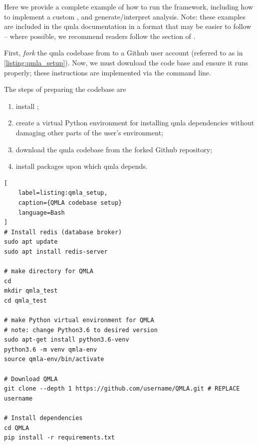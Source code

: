 Here we provide a complete example of how to run the  framework, 
    including how to implement a custom , 
    and generate/interpret analysis.
Note: these examples are included in the \gls{qmla} documentation in a format that may be easier to follow -- 
    where possible, we recommend readers follow the  section of \cite{qmla_docs}.

\par 

First, \emph{fork} the \gls{qmla} codebase from \cite{flynn2021QMLA}
    to a Github user account (referred to as  in \cref{listing:qmla_setup}).
Now, we must download the code base and ensure it runs properly;
    these instructions are implemented via the command line\footnotemark. 

The steps of preparing the codebase are 
\begin{enumerate}
\item install ;
\item create a virtual Python environment for installing \gls{qmla} dependencies without damaging other parts of 
the user's environment;
\item download the \gls{qmla} codebase from 
    the forked Github repository;
\item install packages upon which \gls{qmla} depends. 
\end{enumerate}
    
\begin{lstlisting}[
    label=listing:qmla_setup,
    caption={QMLA codebase setup}
    language=Bash
]
# Install redis (database broker)
sudo apt update
sudo apt install redis-server
 
# make directory for QMLA
cd
mkdir qmla_test
cd qmla_test

# make Python virtual environment for QMLA
# note: change Python3.6 to desired version
sudo apt-get install python3.6-venv 
python3.6 -m venv qmla-env    
source qmla-env/bin/activate

# Download QMLA
git clone --depth 1 https://github.com/username/QMLA.git # REPLACE username

# Install dependencies
cd QMLA 
pip install -r requirements.txt 
\end{lstlisting}

